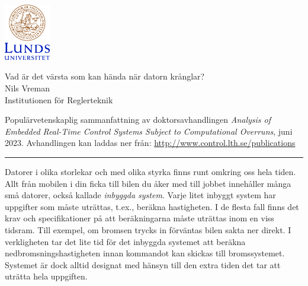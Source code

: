 \documentclass[svenska]{style/LTHthesis}
\begin{document}
\noindent
\begin{minipage}[]{0.25\textwidth}
    \noindent\includegraphics[width=20mm]{style/LUCsv}
    \par\vspace*{3mm} 
\end{minipage}\hfill
\begin{minipage}[]{0.74\textwidth}
    \vspace*{-3mm}
    \sffamily
    \begin{flushleft}
        \huge Vad är det värsta som kan hända när datorn krånglar? \\[2mm]
        \Large Nils Vreman\\[1mm]
        \normalsize Institutionen för Reglerteknik
    \end{flushleft}
\end{minipage}

\par\vspace{1mm}  

\begin{sffamily}\noindent
    Populärvetenskaplig sammanfattning av doktorsavhandlingen \emph{Analysis of Embedded Real-Time Control Systems Subject to Computational Overruns}, juni 2023.
    Avhandlingen kan laddas ner från: \url{http://www.control.lth.se/publications}
\end{sffamily}

\vspace{2mm}\hrule\vspace{3mm}

\noindent
Datorer i olika storlekar och med olika styrka finns runt omkring oss hela tiden.
Allt från mobilen i din ficka till bilen du åker med till jobbet innehåller många små datorer, också kallade \emph{inbyggda system}.
Varje litet inbyggt system har uppgifter som måste uträttas, t.ex., beräkna hastigheten.
I de flesta fall finns det krav och specifikationer på att beräkningarna måste uträttas inom en viss tidsram.
Till exempel, om bromsen trycks in förväntas bilen sakta ner direkt.
I verkligheten tar det lite tid för det inbyggda systemet att beräkna nedbromsningshastigheten innan kommandot kan skickas till bromssystemet.
Systemet är dock alltid designat med hänsyn till den extra tiden det tar att uträtta hela uppgiften.
\end{document}
